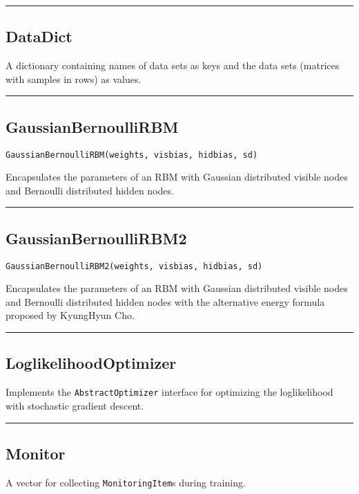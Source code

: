 \noindent\rule{\textwidth}{1pt}
\subsection*{DataDict}  \label{bms_DataDict}
A dictionary containing names of data sets as keys and the data sets (matrices with samples in rows) as values.

\noindent\rule{\textwidth}{1pt}
\subsection*{GaussianBernoulliRBM}  \label{bms_GaussianBernoulliRBM}
\begin{verbatim}
GaussianBernoulliRBM(weights, visbias, hidbias, sd)
\end{verbatim}
Encapsulates the parameters of an RBM with Gaussian distributed visible nodes and Bernoulli distributed hidden nodes.

\noindent\rule{\textwidth}{1pt}
\subsection*{GaussianBernoulliRBM2}  \label{bms_GaussianBernoulliRBM2}
\begin{verbatim}
GaussianBernoulliRBM2(weights, visbias, hidbias, sd)
\end{verbatim}
Encapsulates the parameters of an RBM with Gaussian distributed visible nodes and Bernoulli distributed hidden nodes with the alternative energy formula proposed by KyungHyun Cho.

\noindent\rule{\textwidth}{1pt}
\subsection*{LoglikelihoodOptimizer}  \label{bms_LoglikelihoodOptimizer}
Implements the \texttt{AbstractOptimizer} interface for optimizing the loglikelihood with stochastic gradient descent.

\noindent\rule{\textwidth}{1pt}
\subsection*{Monitor}  \label{bms_Monitor}
A vector for collecting \texttt{MonitoringItem}s during training.

